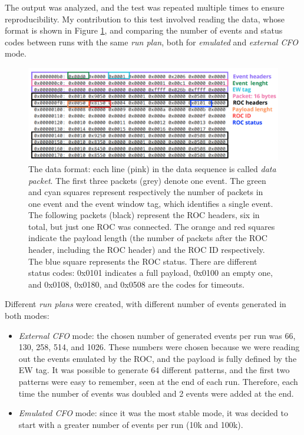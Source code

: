 The output was analyzed, and the test was repeated multiple times to ensure reproducibility. 
My contribution to this test involved reading the data, whose format is shown in Figure \ref{fig:dataformat}, 
and comparing the number of events and status codes between runs with the same \textit{run plan}, 
both for \textit{emulated} and \textit{external CFO} mode. 
\begin{figure}[!h]
  \centering
  \includegraphics[width=\textwidth]{figures/png/Screenshot_20240628_104216.png}
  \caption[The data format.]{The data format: each line (pink) in the data sequence is called \textit{data packet}. 
  The first three packets (grey) denote one event. The green and cyan squares represent respectively
  the number of packets in one event and the event window tag, which identifies a single event. 
  The following packets (black) represent the ROC headers, six in total, but just one ROC was connected. 
  The orange and red squares indicate the payload length (the number of packets after 
  the ROC header, including the ROC header) and the ROC ID respectively. The blue square represents 
  the ROC status. There are different status codes: 0x0101 indicates a full payload, 0x0100 an empty one, 
  and 0x0108, 0x0180, and 0x0508 are the codes for timeouts.}
  \label{fig:dataformat}
\end{figure}
Different \textit{run plans} were created, with different number of events generated in both modes:
\begin{itemize}
  \item \textit{External CFO} mode: the chosen number of generated 
  events per run was 66, 130, 258, 514, and 1026. These numbers 
  were chosen because we were reading out the events emulated by 
  the ROC, and the payload is fully defined by the EW tag. 
  It was possible to generate 64 different patterns, and the 
  first two patterns were easy to remember, seen at the end of each run. 
  Therefore, each time the number of events was doubled and 2 events were added at the end.
  \item \textit{Emulated CFO} mode: since it was the most stable mode, 
  it was decided to start with a greater number of events per run (10k and 100k).
\end{itemize}


